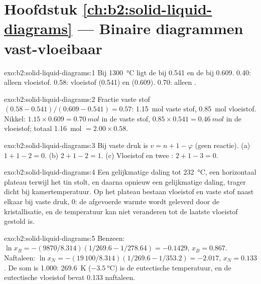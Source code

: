 \section*{Hoofdstuk \ref{ch:b2:solid-liquid-diagrams} --- Binaire diagrammen vast-vloeibaar}

\begin{solution}{exo:b2:solid-liquid-diagrams:1}
Bij \qty{1300}{\degreeCelsius} ligt de  bij 0.541 en de  bij 0.609.
0.40: alleen vloeistof. 0.58: vloeistof (0.541) en  (0.609). 0.70:
alleen .
\end{solution}

\begin{solution}{exo:b2:solid-liquid-diagrams:2}
Fractie vaste stof $(0.58 - 0.541)/(0.609 - 0.541) = 0.57$: \qty{1.15}{mol} vaste stof,
\qty{0.85}{mol} vloeistof. Nikkel: $1.15 \times 0.609 = \qty{0.70}{mol}$ in de
vaste stof, $0.85 \times 0.541 = \qty{0.46}{mol}$ in de vloeistof; totaal \qty{1.16}{mol}
$= 2.00 \times 0.58$.
\end{solution}

\begin{solution}{exo:b2:solid-liquid-diagrams:3}
Bij vaste druk is $v = n + 1 - \varphi$ (geen reactie). (a) $1 + 1 - 2 = 0$.
(b) $2 + 1 - 2 = 1$. (c) Vloeistof en twee : $2 + 1 - 3 = 0$.
\end{solution}

\begin{solution}{exo:b2:solid-liquid-diagrams:4}
Een gelijkmatige daling tot \qty{232}{\degreeCelsius}, een horizontaal plateau terwijl het tin
stolt, en daarna opnieuw een gelijkmatige daling, trager dicht bij kamertemperatuur. Op het
plateau bestaan vloeistof en vaste stof naast elkaar bij vaste druk,  0: de
afgevoerde warmte wordt geleverd door de kristallisatie, en de temperatuur kan niet veranderen
tot de laatste vloeistof gestold is.
\end{solution}

\begin{solution}{exo:b2:solid-liquid-diagrams:5}
Benzeen: $\ln x_B = -(9870/8.314)(1/269.6 - 1/278.64) = -0.1429$, $x_B =
0.867$. Naftaleen: $\ln x_N = -(19\,100/8.314)(1/269.6 - 1/353.2) = -2.017$,
$x_N = 0.133$. De som is 1.000: \qty{269.6}{K} ($\qty{-3.5}{\degreeCelsius}$) is
de eutectische temperatuur, en de eutectische vloeistof bevat 0.133 naftaleen.
\end{solution}

